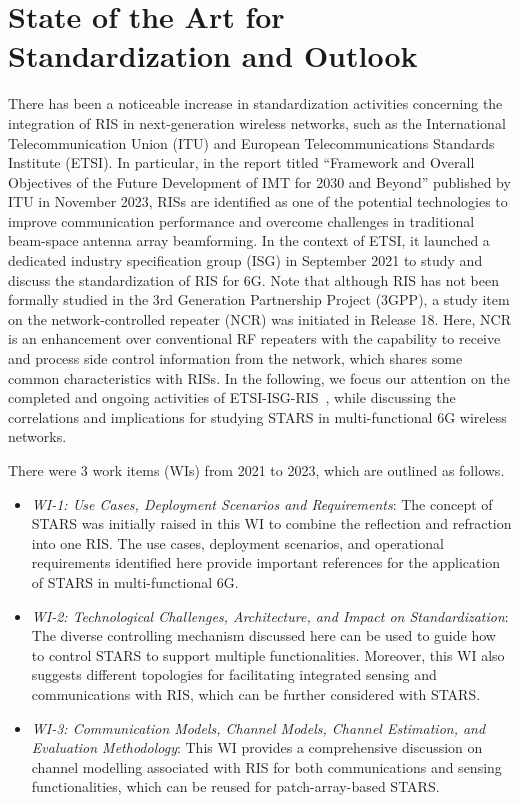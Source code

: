 \documentclass[journal]{IEEEtran}
\theoremstyle{definition}
\begin{document}
\section{State of the Art for Standardization and Outlook}
There has been a noticeable increase in standardization activities concerning the integration of RIS in next-generation wireless networks, such as the International Telecommunication Union (ITU) and European Telecommunications Standards Institute (ETSI). In particular, in the report titled ``Framework and Overall Objectives of the Future Development of IMT for 2030 and Beyond'' published by ITU in November 2023, RISs are identified as one of the potential technologies to improve communication performance and overcome challenges in traditional beam-space antenna array beamforming. In the context of ETSI, it launched a dedicated industry specification group (ISG) in September 2021 to study and discuss the standardization of RIS for 6G. Note that although RIS has not been formally studied in the 3rd Generation Partnership Project (3GPP), a study item on the network-controlled repeater (NCR) was initiated in Release 18. Here, NCR is an enhancement over conventional RF repeaters with the capability to receive and process side control information from the network, which shares some common characteristics with RISs. In the following, we focus our attention on the completed and ongoing activities of ETSI-ISG-RIS~\cite{ETSI-ISG-RIS}, while discussing the correlations and implications for studying STARS in multi-functional 6G wireless networks.

There were 3 work items (WIs) from 2021 to 2023, which are outlined as follows.
\begin{itemize}	
	\item \emph{WI-1: Use Cases, Deployment Scenarios and Requirements}: The concept of STARS was initially raised in this WI to combine the reflection and refraction into one RIS. The use cases, deployment scenarios, and operational requirements identified here provide important references for the application of STARS in multi-functional 6G.
    \item \emph{WI-2: Technological Challenges, Architecture, and Impact on Standardization}: The diverse controlling mechanism discussed here can be used to guide how to control STARS to support multiple functionalities. Moreover, this WI also suggests different topologies for facilitating integrated sensing and communications with RIS, which can be further considered with STARS.  
    \item \emph{WI-3: Communication Models, Channel Models, Channel Estimation, and Evaluation Methodology}: This WI provides a comprehensive discussion on channel modelling associated with RIS for both communications and sensing functionalities, which can be reused for patch-array-based STARS. 
\end{itemize}
\end{document}
